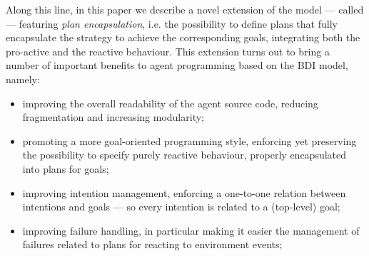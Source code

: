 %
Along this line, in this paper we describe a novel extension of the
{\asl} model --- called {\aser} --- featuring \emph{plan
  encapsulation}, i.e. the possibility to define plans that fully
encapsulate the strategy to achieve the corresponding goals,
integrating both the pro-active and the reactive behaviour.
%
%
This extension turns out to bring a number of important benefits to
agent programming based on the BDI model, namely:
%
\begin{itemize}
\item improving the overall readability of the agent source code,
  reducing fragmentation and increasing modularity;
\item promoting a more goal-oriented programming style, enforcing yet
  preserving the possibility to specify purely reactive behaviour,
  properly encapsulated into plans for goals;
\item improving intention management, enforcing a one-to-one relation
  between intentions and goals --- so every intention is related to a
  (top-level) goal;
\item improving failure handling, in particular making it easier the
  management of failures related to plans for reacting to environment
  events;
\end{itemize}
%



